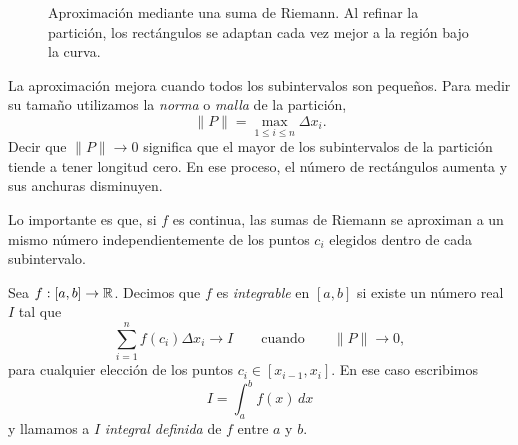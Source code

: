 \begin{figure}[htbp]
\centering
{}
\caption{Aproximación mediante una suma de Riemann. Al refinar la partición, los rectángulos se adaptan cada vez mejor a la región bajo la curva.}
\label{fig:riemann}
\end{figure}

La aproximación mejora cuando todos los subintervalos son pequeños. Para medir su tamaño utilizamos la \emph{norma} o \emph{malla} de la partición,
\[
\|P\|=\max_{1\leq i\leq n}\Delta x_i.
\]
Decir que $\|P\|\to0$ significa que el mayor de los subintervalos de la partición tiende a tener longitud cero. En ese proceso, el número de rectángulos aumenta y sus anchuras disminuyen.

Lo importante es que, si $f$ es continua, las sumas de Riemann se aproximan a un mismo número independientemente de los puntos $c_i$ elegidos dentro de cada subintervalo.

\begin{definition}
Sea $f:[a,b]\to\mathbb{R}$. Decimos que $f$ es \emph{integrable} en $[a,b]$ si existe un número real $I$ tal que
\[
\sum_{i=1}^{n}f(c_i)\Delta x_i\longrightarrow I
\qquad\text{cuando}\qquad
\|P\|\longrightarrow0,
\]
para cualquier elección de los puntos $c_i\in[x_{i-1},x_i]$. En ese caso escribimos
\[
\boxed{I=\int_a^b f(x)\,dx}
\]
y llamamos a $I$ \emph{integral definida} de $f$ entre $a$ y $b$.
\end{definition}

